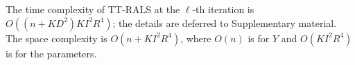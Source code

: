 %

The time complexity of TT-RALS at the $\ell$-th iteration is
$O((n + KD^2)KI^2R^4)$; the details are deferred to
Supplementary material.
%
%
The space complexity is $O(n + KI^2R^4)$, where $O(n)$ is for $Y$ and
$O(KI^2R^4)$ is for the parameters.




